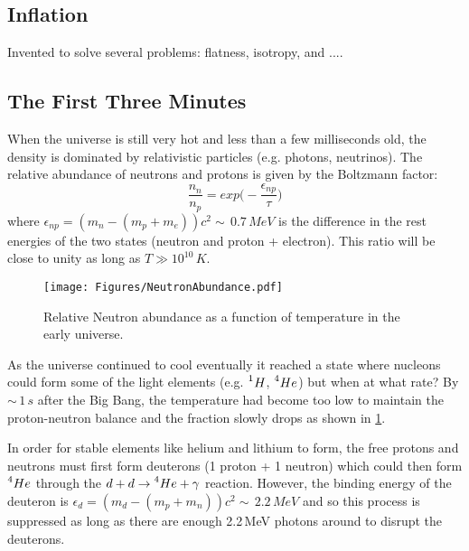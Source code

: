 \subsection{Inflation}
Invented to solve several problems: flatness, isotropy, and ....

\subsection{The First Three Minutes}
When the universe is still very hot and less than a few milliseconds old,
the density is dominated by relativistic particles (e.g. photons, neutrinos).
The relative abundance of neutrons and protons is given by the Boltzmann factor:
\begin{equation}
\frac{n_n}{n_p} = exp\bigg(-\frac{\epsilon_{np}}{\tau}\bigg)
\end{equation}
where $\epsilon_{np} = (m_n - (m_p + m_e))c^2 \sim\,0.7\,MeV$ is the difference in the rest energies of the two states (neutron and proton + electron). This ratio will be close to unity as long as $T \gg 10^{10}\,K$.
\begin{figure}[h]
\centering
\texttt{[image: Figures/NeutronAbundance.pdf]}
\caption{Relative Neutron abundance as a function of temperature in the early universe.}
\label{fig:Neutrons}
\end{figure}

As the universe continued to cool eventually it reached a state where nucleons could form some of the light elements (e.g. $\prescript{1}{}H$, 
$\prescript{4}{}He$) but when at what rate? By $\sim\,1\,s$ after the Big Bang, the temperature had become too low to maintain the proton-neutron balance and the fraction slowly drops as shown in \cref{fig:Neutrons}.

In order for stable elements like helium and lithium to form, the free
protons and neutrons must first form deuterons (1 proton + 1 neutron) which could then form $\prescript{4}{}He$ through the 
$d + d \rightarrow \prescript{4}{}He + \gamma$ reaction. However, the binding energy of the deuteron is $\epsilon_{d} = (m_d - (m_p + m_n))c^2 \sim\,2.2\,MeV$
and so this process is suppressed as long as there are enough 2.2\,MeV photons around to disrupt the deuterons.



